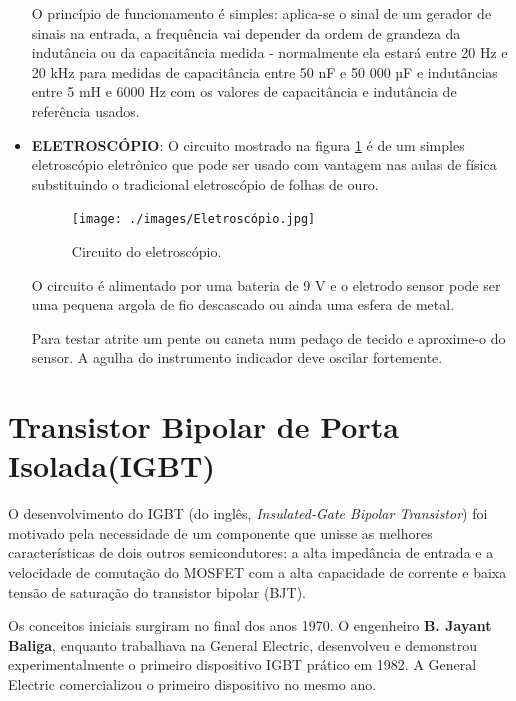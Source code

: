 \documentclass[12pt]{article}
\begin{document}
\begin{itemize}
\begin{figure}[htpb!]
                    \end{figure}

                O princípio de funcionamento é simples: aplica-se o sinal de um gerador de sinais na entrada, a frequência vai depender da ordem de grandeza da indutância ou da capacitância medida - normalmente ela estará entre 20 Hz e 20 kHz para medidas de capacitância entre 50 nF e 50 000 µF e indutâncias entre 5 mH e 6000 Hz com os valores de capacitância e indutância de referência usados.

                \item \textbf{ELETROSCÓPIO}: O circuito mostrado na figura \ref{fig:Eletroscópio} é de um simples eletroscópio eletrônico que pode ser usado com vantagem nas aulas de física substituindo o tradicional eletroscópio de folhas de ouro.

                    \begin{figure}[htpb!]

                        \centering
                        \texttt{[image: ./images/Eletroscópio.jpg]}
                        \caption{Circuito do eletroscópio.}
                        \label{fig:Eletroscópio}

                    \end{figure}

                O circuito é alimentado por uma bateria de 9 V e o eletrodo sensor pode ser uma pequena argola de fio descascado ou ainda uma esfera de metal.

                Para testar atrite um pente ou caneta num pedaço de tecido e aproxime-o do sensor. A agulha do instrumento indicador deve oscilar fortemente.

            \end{itemize}

\section{Transistor Bipolar de Porta Isolada(IGBT)}

        O desenvolvimento do IGBT (do inglês, \textit{Insulated-Gate Bipolar Transistor}) foi motivado pela necessidade de um componente que unisse as melhores características de dois outros semicondutores: a alta impedância de entrada e a velocidade de comutação do MOSFET com a alta capacidade de corrente e baixa tensão de saturação do transistor bipolar (BJT).

        Os conceitos iniciais surgiram no final dos anos 1970. O engenheiro \textbf{B. Jayant Baliga}, enquanto trabalhava na General Electric, desenvolveu e demonstrou experimentalmente o primeiro dispositivo IGBT prático em 1982. A General Electric comercializou o primeiro dispositivo no mesmo ano.
\end{document}
